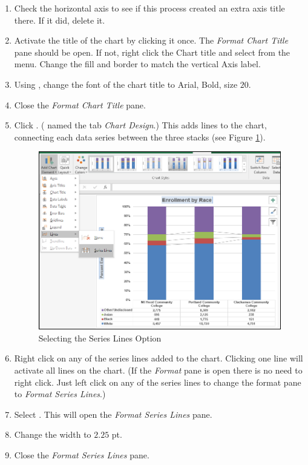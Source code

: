 \begin{enumbox}
\begin{enumerate}
		\item Check the horizontal axis to see if this process created an extra axis title there. If it did, delete it.
		\item Activate the title of the chart by clicking it once. The \textit{Format Chart Title} pane should be open. If not, right click the Chart title and select  from the menu. Change the fill and border to match the vertical Axis label.
		\item Using , change the font of the chart title to Arial, Bold, size $ 20 $.
		\item Close the \textit{Format Chart Title} pane.
		\item Click . ( named the tab \textit{Chart Design}.) This adds lines to the chart, connecting each data series between the three stacks (see Figure \ref{04:fig40}).
	
		\begin{figure}[H]
			\centering
			\includegraphics[width=\maxwidth{.95\linewidth}]{gfx/ch04_fig40}
			\caption{Selecting the Series Lines Option}
			\label{04:fig40}
		\end{figure}

		\item Right click on any of the series lines added to the chart. Clicking one line will activate all lines on the chart. (If the \textit{Format} pane is open there is no need to right click. Just left click on any of the series lines to change the format pane to \textit{Format Series Lines}.)
		\item Select . This will open the \textit{Format Series Lines} pane.
		\item Change the width to $ 2.25 $ pt.
		\item Close the \textit{Format Series Lines} pane.
	\end{enumerate}
\end{enumbox}

